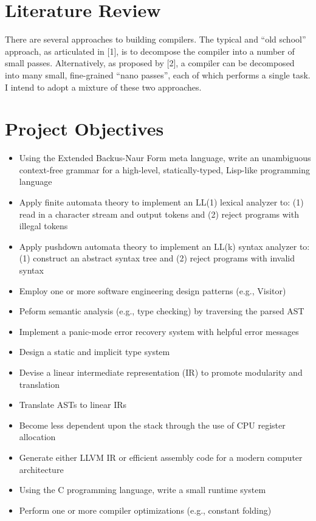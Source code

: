 \documentclass[12pt]{report}
\begin{document}
\section*{{\large Literature Review}}
There are several approaches to building compilers.  The typical and ``old school'' approach, as articulated in [1], is to decompose the compiler into a number of small passes. Alternatively, as proposed by [2], a compiler can be decomposed into many small, fine-grained ``nano passes'', each of which performs a single task.  I intend to adopt a mixture of these two approaches.

\section*{{\large Project Objectives}}
\begin{itemize}
	\item Using the Extended Backus-Naur Form meta language, write an unambiguous context-free grammar for a high-level, statically-typed, Lisp-like programming language
	\item Apply finite automata theory to implement an LL(1) lexical analyzer to: (1) read in a character stream and output tokens and (2) reject programs with illegal tokens
	\item Apply pushdown automata theory to implement an LL(k) syntax analyzer to: (1) construct an abstract syntax tree and (2) reject programs with invalid syntax
	\item Employ one or more software engineering design patterns (e.g., Visitor) 
	\item Peform semantic analysis (e.g., type checking) by traversing the parsed AST
	\item Implement a panic-mode error recovery system with helpful error messages
	\item Design a static and implicit type system
	\item Devise a linear intermediate representation (IR) to promote modularity and translation
	\item Translate ASTs to linear IRs
	\item Become less dependent upon the stack through the use of CPU register allocation
	\item Generate either LLVM IR or efficient assembly code for a modern computer architecture
	\item Using the C programming language, write a small runtime system
	\item Perform one or more compiler optimizations (e.g., constant folding)
\end{itemize}
\end{document}
